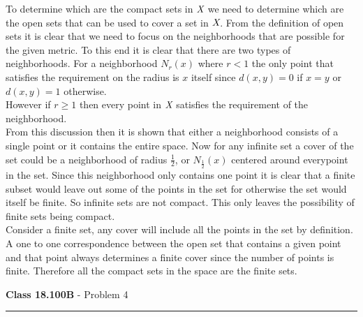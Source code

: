 \documentclass[11pt,reqno]{article}
\begin{document}
To determine which are the compact sets in $\emph{X}$ we need to determine which are the open sets that can be used to cover a set in $\emph{X}$.
From the definition of open sets it is clear that we need to focus on the neighborhoods that are possible for the given metric. To this end it is clear that there are two types of neighborhoods. For a neighborhood $N_r(x)$ where $r < 1$ the only point that satisfies the requirement on the radius is $x$ itself since $d(x,y) = 0$ if $x = y$ or $d(x,y) = 1$ otherwise.  \\
\indent However if $r \ge 1$ then every point in $\emph{X}$ satisfies the requirement of the neighborhood.\\
\indent From this discussion then it is shown that either a neighborhood consists of a single point or it contains the entire space. Now for any infinite set a cover of the set could be a neighborhood of radius $\frac{1}{2}$, or $N_{\frac{1}{2}}(x)$ centered around everypoint in the set. Since this neighborhood only contains one point it is clear that a finite subset would leave out some of the points in the set for otherwise the set would itself be finite. So infinite sets are not compact. This only leaves the possibility of finite sets being compact. \\
\indent Consider a finite set, any cover will include all the points in the set by definition. A one to one correspondence between the open set that contains a given point and that point always determines a finite cover since the number of points is finite. Therefore all the compact sets in the space are the finite sets.

\vspace{15pt}
\begin{flushleft} 
\textbf{Class 18.100B} - Problem 4\\
\rule{500pt}{1pt}\\
\end{flushleft} 
\end{document}
